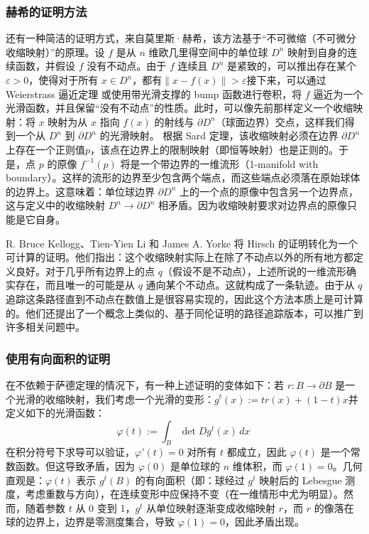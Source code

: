 \subsubsection{赫希的证明方法}
还有一种简洁的证明方式，来自莫里斯·赫希，该方法基于“不可微缩（不可微分收缩映射）”的原理。设 $f$ 是从 $n$ 维欧几里得空间中的单位球 $D^n$ 映射到自身的连续函数，并假设 $f$ 没有不动点。由于 $f$ 连续且 $D^n$ 是紧致的，可以推出存在某个 $\varepsilon > 0$，使得对于所有 $x \in D^n$，都有$\|x - f(x)\| > \varepsilon$接下来，可以通过 Weierstrass 逼近定理 或使用带光滑支撑的 bump 函数进行卷积，将 $f$ 逼近为一个光滑函数，并且保留“没有不动点”的性质。此时，可以像先前那样定义一个收缩映射：将 $x$ 映射为从 $x$ 指向 $f(x)$ 的射线与 $\partial D^n$（球面边界）交点，这样我们得到一个从 $D^n$ 到 $\partial D^n$ 的光滑映射。
根据 Sard 定理，该收缩映射必须在边界 $\partial D^n$ 上存在一个正则值$p$，该点在边界上的限制映射（即恒等映射）也是正则的。于是，点 $p$ 的原像 $f^{-1}(p)$ 将是一个带边界的一维流形（1-manifold with boundary）。这样的流形的边界至少包含两个端点，而这些端点必须落在原始球体的边界上。这意味着：单位球边界 $\partial D^n$ 上的一个点的原像中包含另一个边界点，这与定义中的收缩映射 $D^n \to \partial D^n$ 相矛盾。因为收缩映射要求对边界点的原像只能是它自身。

R. Bruce Kellogg、Tien-Yien Li 和 James A. Yorke 将 Hirsch 的证明转化为一个可计算的证明。他们指出：这个收缩映射实际上在除了不动点以外的所有地方都定义良好。对于几乎所有边界上的点 $q$（假设不是不动点），上述所说的一维流形确实存在，而且唯一的可能是从 $q$ 通向某个不动点。这就构成了一条轨迹。由于从 $q$ 追踪这条路径直到不动点在数值上是很容易实现的，因此这个方法本质上是可计算的。他们还提出了一个概念上类似的、基于同伦证明的路径追踪版本，可以推广到许多相关问题中。
\subsubsection{使用有向面积的证明}
在不依赖于萨德定理的情况下，有一种上述证明的变体如下：若 $r: B \to \partial B$ 是一个光滑的收缩映射，我们考虑一个光滑的变形：$g^t(x) := t r(x) + (1 - t)x$并定义如下的光滑函数：
$$
\varphi(t) := \int_B \det Dg^t(x)\,dx~
$$
在积分符号下求导可以验证，$\varphi'(t) = 0$ 对所有 $t$ 都成立，因此 $\varphi(t)$ 是一个常数函数。但这导致矛盾，因为 $\varphi(0)$ 是单位球的 $n$ 维体积，而 $\varphi(1) = 0$。几何直观是：$\varphi(t)$ 表示 $g^t(B)$ 的有向面积（即：球经过 $g^t$ 映射后的 Lebesgue 测度，考虑重数与方向），在连续变形中应保持不变（在一维情形中尤为明显）。然而，随着参数 $t$ 从 0 变到 1，$g^t$ 从单位映射逐渐变成收缩映射 $r$，而 $r$ 的像落在球的边界上，边界是零测度集合，导致 $\varphi(1) = 0$，因此矛盾出现。
